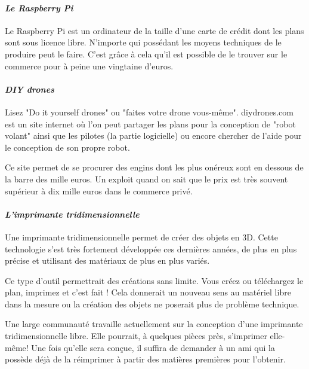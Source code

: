 \paragraph{\textit{Le Raspberry Pi}}
Le Raspberry Pi est un ordinateur de la taille d'une carte de crédit dont les plans sont sous licence libre. N'importe qui possédant les moyens techniques de le produire peut le faire. C'est grâce à cela qu'il est possible de le trouver sur le commerce pour à peine une vingtaine d'euros.

\paragraph{\textit{DIY drones}}
Lisez "Do it yourself drones" ou "faites votre drone vous-même". diydrones.com est un site internet où l'on peut partager les plans pour la conception de "robot volant" ainsi que les pilotes (la partie logicielle) ou encore chercher de l'aide pour le conception de son propre robot.

Ce site permet de se procurer des engins dont les plus onéreux sont en dessous de la barre des mille euros. Un exploit quand on sait que le prix est très souvent supérieur à dix mille euros dans le commerce privé.

\paragraph{\textit{L'imprimante tridimensionnelle}}
Une imprimante tridimensionnelle permet de créer des objets en 3D. Cette technologie s'est très fortement développée ces dernières années, de plus en plus précise et utilisant des matériaux de plus en plus variés.

Ce type d'outil permettrait des créations sans limite. Vous créez ou téléchargez le plan, imprimez et c'est fait ! Cela donnerait un nouveau sens au matériel libre dans la mesure ou la création des objets ne poserait plus de problème technique.

Une large communauté travaille actuellement sur la conception d'une imprimante tridimensionnelle libre. Elle pourrait, à quelques pièces près, s'imprimer elle-même! Une fois qu'elle sera conçue, il suffira de demander à un ami qui la possède déjà de la réimprimer à partir des matières premières pour l'obtenir.

